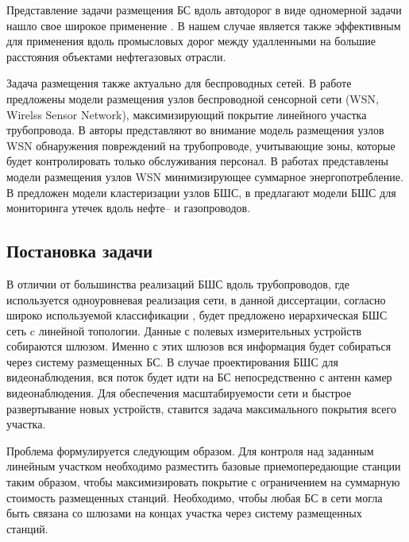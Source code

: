 Представление задачи размещения БС вдоль автодорог в виде одномерной задачи нашло свое широкое применение \cite{Ivanov2018, Reis2014, Vishnevsky2016_optimization, Liu2014, Gao2018, Jalooli2019, Zhang2017}. В нашем случае является также эффективным для применения вдоль промысловых дорог между удалленными на большие расстояния объектами нефтегазовых отрасли.

Задача размещения также актуально для беспроводных сетей. В работе \cite{Alduraibi2016} предложены модели размещения узлов беспроводной сенсорной сети (WSN, Wirelss Sensor Network), максимизирующий покрытие линейного участка трубопровода. В \cite{Aria2020} авторы представляют во внимание модель размещения узлов WSN обнаружения повреждений на трубопроводе, учитывающие зоны, которые будет контролировать только обслуживания персонал. В работах \cite{Hussein2020, Varshney2018, Varshney2021} представлены модели размещения узлов WSN минимизирующее суммарное энергопотребление. В \cite{Li2020, Albaseer2019} предложен модели кластеризации узлов БШС, в \cite{Albaseer2019} предлагают модели БШС для мониторинга утечек вдоль нефте-- и газопроводов.

\subsection{Постановка задачи}

В отличии от большинства реализаций БШС вдоль трубопроводов, где используется одноуровневая реализация сети, в данной диссертации, согласно широко используемой классификации \cite{Jawhar2009, Varshney2015, Abbas2018, Wang2011, Jawhar2013}, будет предложено иерархическая БШС сеть c линейной топологии. Данные с полевых измерительных устройств собираются шлюзом. Именно с этих шлюзов вся информация будет собираться через систему размещенных БС. В случае проектирования БШС для видеонаблюдения, вся поток будет идти на БС непосредственно с антенн камер видеонаблюдения. Для обеспечения масштабируемости сети и быстрое развертывание новых устройств,  ставится задача максимального покрытия всего участка.

Проблема формулируется следующим образом. Для контроля над заданным линейным участком необходимо разместить базовые приемопередающие станции таким образом, чтобы максимизировать покрытие с ограничением на суммарную стоимость размещенных станций. Необходимо, чтобы любая БС в сети могла быть связана со шлюзами на концах участка через систему размещенных станций.

